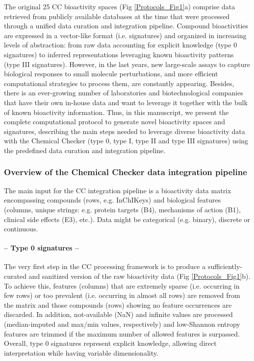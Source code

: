 The original 25 CC bioactivity spaces (Fig \ref{Protocols_Fig1}a) comprise data retrieved from publicly available databases at the time that were processed through a unified data curation and integration pipeline. Compound bioactivities are expressed in a vector-like format (i.e. signatures) and organized in increasing levels of abstraction: from raw data accounting for explicit knowledge (type 0 signatures) to inferred representations leveraging known bioactivity patterns (type III signatures). However, in the last years, new large-scale assays to capture biological responses to small molecule perturbations, and more efficient computational strategies to process them, are constantly appearing\cite{anglada-girotto_combining_2022, mitchell_proteome-wide_2023, offensperger_large-scale_2024}. Besides, there is an ever-growing number of laboratories and biotechnological companies that have their own in-house data and want to leverage it together with the bulk of known bioactivity information. Thus, in this manuscript, we present the complete computational protocol to generate novel bioactivity spaces and signatures, describing the main steps needed to leverage diverse bioactivity data with the Chemical Checker (type 0, type I, type II and type III signatures) using the predefined data curation and integration pipeline.

\subsubsection{Overview of the Chemical Checker data integration pipeline}
\label{Overview of the Chemical Checker data integration pipeline}

The main input for the CC integration pipeline is a bioactivity data matrix encompassing compounds (rows, e.g. InChIKeys) and biological features (columns, unique strings: e.g. protein targets (B4), mechanisms of action (B1), clinical side effects (E3), etc.). Data might be categorical (e.g. binary), discrete or continuous.

\paragraph{-- Type 0 signatures --} \leavevmode

The very first step in the CC processing framework is to produce a sufficiently-curated and sanitized version of the raw bioactivity data (Fig \ref{Protocols_Fig1}b). To achieve this, features (columns) that are extremely sparse (i.e. occurring in few rows) or too prevalent (i.e. occurring in almost all rows) are removed from the matrix and those compounds (rows) showing no feature occurrences are discarded. In addition, not-available (NaN) and infinite values are processed (median-imputed and max/min values, respectively) and low-Shannon entropy features are trimmed if the maximum number of allowed features is surpassed. Overall, type 0 signatures represent explicit knowledge, allowing direct interpretation while having variable dimensionality. 

